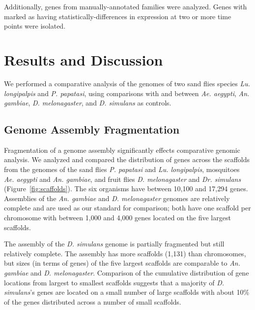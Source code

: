 Additionally, genes from manually-annotated families were analyzed.  Genes with marked as having statistically-differences in expression at two or more time points were isolated.

\section{Results and Discussion}
We performed a comparative analysis of the genomes of two sand flies species \emph{Lu. longipalpis} and \emph{P. papatasi}, using comparisons with and between \emph{Ae. aegypti}, \emph{An. gambiae}, \emph{D. melonagaster}, and \emph{D. simulans} as controls.

\subsection{Genome Assembly Fragmentation}
Fragmentation of a genome assembly significantly effects comparative genomic analysis.  We analyzed and compared the distribution of genes across the scaffolds from the genomes of the sand flies \emph{P. papatasi} and \emph{Lu. longipalpis}, mosquitoes \emph{Ae. aegypti} and \emph{An. gambiae}, and fruit flies \emph{D. melonagaster} and \emph{Dr. simulans} (Figure~\ref{fig:scaffolds}).  The six organisms have between 10,100 and 17,294 genes.  Assemblies of the \emph{An. gambiae} and \emph{D. melonagaster} genomes are relatively complete and are used as our standard for comparison; both have one scaffold per chromosome with between 1,000 and 4,000 genes located on the five largest scaffolds.

The assembly of the \emph{D. simulans} genome is partially fragmented but still relatively complete.  The assembly has more scaffolds (1,131) than chromosomes, but sizes (in terms of genes) of the five largest scaffolds are comparable to \emph{An. gambiae} and \emph{D. melonagaster}.  Comparison of the cumulative distribution of gene locations from largest to smallest scaffolds suggests that a majority of \emph{D. simulans}'s genes are located on a small number of large scaffolds with about 10\% of the genes distributed across a number of small scaffolds.

